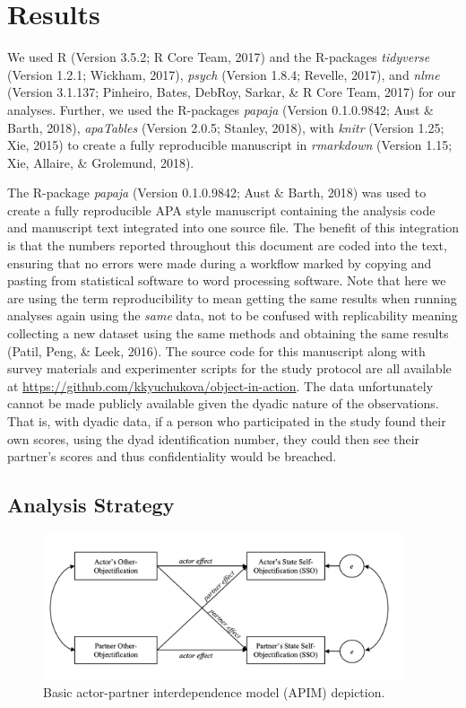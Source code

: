 \documentclass[man]{apa6}
\begin{document}
\section{Results}\label{results}

We used R (Version 3.5.2; R Core Team, 2017) and the R-packages
\emph{tidyverse} (Version 1.2.1; Wickham, 2017), \emph{psych} (Version
1.8.4; Revelle, 2017), and \emph{nlme} (Version 3.1.137; Pinheiro,
Bates, DebRoy, Sarkar, \& R Core Team, 2017) for our analyses. Further,
we used the R-packages \emph{papaja} (Version 0.1.0.9842; Aust \& Barth,
2018), \emph{apaTables} (Version 2.0.5; Stanley, 2018), with
\emph{knitr} (Version 1.25; Xie, 2015) to create a fully reproducible
manuscript in \emph{rmarkdown} (Version 1.15; Xie, Allaire, \&
Grolemund, 2018).

The R-package \emph{papaja} (Version 0.1.0.9842; Aust \& Barth, 2018)
was used to create a fully reproducible APA style manuscript containing
the analysis code and manuscript text integrated into one source file.
The benefit of this integration is that the numbers reported throughout
this document are coded into the text, ensuring that no errors were made
during a workflow marked by copying and pasting from statistical
software to word processing software. Note that here we are using the
term reproducibility to mean getting the same results when running
analyses again using the \emph{same} data, not to be confused with
replicability meaning collecting a new dataset using the same methods
and obtaining the same results (Patil, Peng, \& Leek, 2016). The source
code for this manuscript along with survey materials and experimenter
scripts for the study protocol are all available at
\url{https://github.com/kkyuchukova/object-in-action}. The data
unfortunately cannot be made publicly available given the dyadic nature
of the observations. That is, with dyadic data, if a person who
participated in the study found their own scores, using the dyad
identification number, they could then see their partner's scores and
thus confidentiality would be breached.

\subsection{Analysis Strategy}\label{analysis-strategy}

\begin{figure}
\includegraphics[width=400px]{figures/APIM_figure} \caption{Basic actor-partner interdependence model (APIM) depiction.}\label{fig:apim}
\end{figure}
\end{document}

